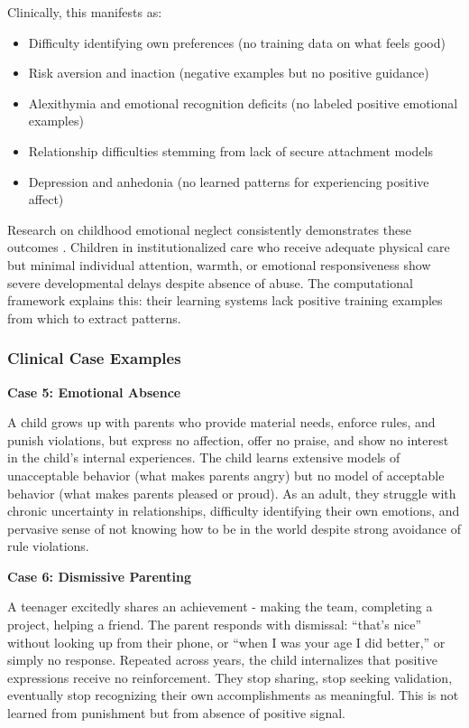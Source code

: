 \documentclass{article}
\begin{document}
Clinically, this manifests as:
\begin{itemize}
\item Difficulty identifying own preferences (no training data on what feels good)
\item Risk aversion and inaction (negative examples but no positive guidance)
\item Alexithymia and emotional recognition deficits (no labeled positive emotional examples)
\item Relationship difficulties stemming from lack of secure attachment models
\item Depression and anhedonia (no learned patterns for experiencing positive affect)
\end{itemize}

Research on childhood emotional neglect consistently demonstrates these outcomes \cite{glaser2002}. Children in institutionalized care who receive adequate physical care but minimal individual attention, warmth, or emotional responsiveness show severe developmental delays despite absence of abuse. The computational framework explains this: their learning systems lack positive training examples from which to extract patterns.

\subsubsection{Clinical Case Examples}

\textbf{Case 5: Emotional Absence}

A child grows up with parents who provide material needs, enforce rules, and punish violations, but express no affection, offer no praise, and show no interest in the child's internal experiences. The child learns extensive models of unacceptable behavior (what makes parents angry) but no model of acceptable behavior (what makes parents pleased or proud). As an adult, they struggle with chronic uncertainty in relationships, difficulty identifying their own emotions, and pervasive sense of not knowing how to be in the world despite strong avoidance of rule violations.

\textbf{Case 6: Dismissive Parenting}

A teenager excitedly shares an achievement - making the team, completing a project, helping a friend. The parent responds with dismissal: ``that's nice'' without looking up from their phone, or ``when I was your age I did better,'' or simply no response. Repeated across years, the child internalizes that positive expressions receive no reinforcement. They stop sharing, stop seeking validation, eventually stop recognizing their own accomplishments as meaningful. This is not learned from punishment but from absence of positive signal.
\end{document}
